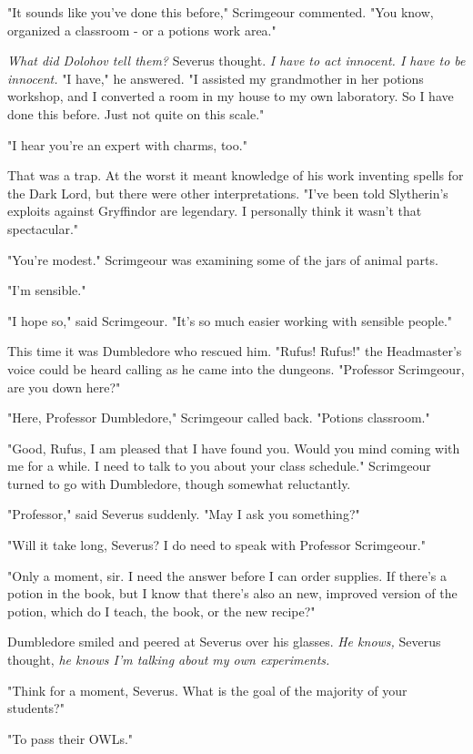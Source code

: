 \documentclass[a4paper,11pt]{article}
\begin{document}
"It sounds like you've done this before," Scrimgeour commented. "You know, organized a classroom - or a potions work area."

\emph{What did Dolohov tell them?} Severus thought. \emph{I have to act innocent. I have to be innocent.} "I have," he answered. "I assisted my grandmother in her potions workshop, and I converted a room in my house to my own laboratory. So I have done this before. Just not quite on this scale."

"I hear you're an expert with charms, too."

That was a trap. At the worst it meant knowledge of his work inventing spells for the Dark Lord, but there were other interpretations. "I've been told Slytherin's exploits against Gryffindor are legendary. I personally think it wasn't that spectacular."

"You're modest." Scrimgeour was examining some of the jars of animal parts.

"I'm sensible."

"I hope so," said Scrimgeour. "It's so much easier working with sensible people."

This time it was Dumbledore who rescued him. "Rufus! Rufus!" the Headmaster's voice could be heard calling as he came into the dungeons. "Professor Scrimgeour, are you down here?"

"Here, Professor Dumbledore," Scrimgeour called back. "Potions classroom."

"Good, Rufus, I am pleased that I have found you. Would you mind coming with me for a while. I need to talk to you about your class schedule." Scrimgeour turned to go with Dumbledore, though somewhat reluctantly.

"Professor," said Severus suddenly. "May I ask you something?"

"Will it take long, Severus? I do need to speak with Professor Scrimgeour."

"Only a moment, sir. I need the answer before I can order supplies. If there's a potion in the book, but I know that there's also an new, improved version of the potion, which do I teach, the book, or the new recipe?"

Dumbledore smiled and peered at Severus over his glasses. \emph{He knows,} Severus thought, \emph{he knows I'm talking about my own experiments.}

"Think for a moment, Severus. What is the goal of the majority of your students?"

"To pass their OWLs."
\end{document}
